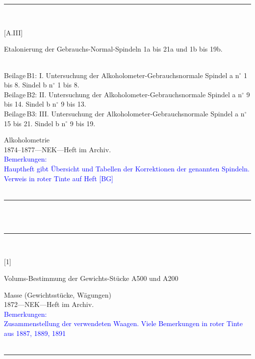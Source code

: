 \\
\vspace*{-2.5pt}\\
\parbox{\textwidth}{%
\rule{\textwidth}{1pt}\vspace*{-3mm}\\
\begin{minipage}[t]{0.22\textwidth}\vspace{0pt}
\Huge\rule[-4mm]{0cm}{1cm}[A.III]
\end{minipage}
\hfill
\begin{minipage}[t]{0.78\textwidth}\vspace{0pt}
\large Etalonierung der Gebrauchs-Normal-Spindeln 1a bis 21a und 1b bis 19b.\rule[-2mm]{0mm}{2mm}
{\footnotesize \\{}
Beilage\,B1: I. Untersuchung der Alkoholometer-Gebrauchsnormale Spindel a n{$^\circ$} 1 bis 8. Sindel b n{$^\circ$} 1 bis 8.\\
Beilage\,B2: II. Untersuchung der Alkoholometer-Gebrauchsnormale Spindel a n{$^\circ$} 9 bis 14. Sindel b n{$^\circ$} 9 bis 13.\\
Beilage\,B3: III. Untersuchung der Alkoholometer-Gebrauchsnormale Spindel a n{$^\circ$} 15 bis 21. Sindel b n{$^\circ$} 9 bis 19.\\
}
\end{minipage}
{\footnotesize\flushright
Alkoholometrie\\
}
1874--1877\quad---\quad NEK\quad---\quad Heft im Archiv.\\
\textcolor{blue}{Bemerkungen:\\{}
Hauptheft gibt Übersicht und Tabellen der Korrektionen der genannten Spindeln. Verweis in roter Tinte auf Heft [BG]\\{}
}
\\[-15pt]
\rule{\textwidth}{1pt}
}
\\
\vspace*{-2.5pt}\\
\parbox{\textwidth}{%
\rule{\textwidth}{1pt}\vspace*{-3mm}\\
\begin{minipage}[t]{0.1\textwidth}\vspace{0pt}
\Huge\rule[-4mm]{0cm}{1cm}[1]
\end{minipage}
\hfill
\begin{minipage}[t]{0.9\textwidth}\vspace{0pt}
\large Volums-Bestimmung der Gewichts-Stücke A500 und A200\rule[-2mm]{0mm}{2mm}
\end{minipage}
{\footnotesize\flushright
Masse (Gewichtsstücke, Wägungen)\\
}
1872\quad---\quad NEK\quad---\quad Heft im Archiv.\\
\textcolor{blue}{Bemerkungen:\\{}
Zusammenstellung der verwendeten Waagen. Viele Bemerkungen in roter Tinte aus 1887, 1889, 1891\\{}
}
\\[-15pt]
\rule{\textwidth}{1pt}
}
